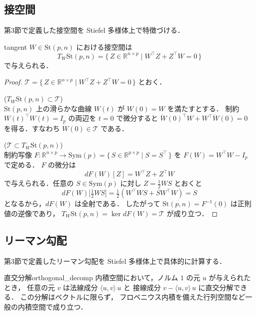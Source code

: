 \documentclass[uplatex, dvipdfmx]{jsarticle}
\begin{document}
\subsection{接空間}

第3節で定義した接空間を Stiefel 多様体上で特徴づける．

\begin{proposition}{}{tangent}
$W\in\mathrm{St}(p,n)$ における接空間は
\[
T_W\mathrm{St}(p,n)
=
\{\, Z\in\mathbb{R}^{n\times p}
\mid
W^\top Z + Z^\top W = 0
\,\}
\]
で与えられる．
\end{proposition}

\begin{proof}
$\mathcal{T}=\{\, Z\in\mathbb{R}^{n\times p}\mid W^\top Z + Z^\top W = 0\,\}$ とおく．

($T_W\mathrm{St}(p,n)\subset\mathcal{T}$)\\
$\mathrm{St}(p,n)$ 上の滑らかな曲線 $W(t)$ が $W(0)=W$ を満たすとする．
制約 $W(t)^\top W(t)=I_p$ の両辺を $t=0$ で微分すると
$\dot W(0)^\top W + W^\top\dot W(0)=0$
を得る．すなわち $\dot W(0)\in\mathcal{T}$ である．

($\mathcal{T}\subset T_W\mathrm{St}(p,n)$)\\
制約写像 $F\colon\mathbb{R}^{n\times p}\to\mathrm{Sym}(p)=\{\, S\in\mathbb{R}^{p\times p}\mid S=S^\top \,\}$ を
$F(W)=W^\top W - I_p$ で定める．
$F$ の微分は
\[
dF(W)[Z]=W^\top Z + Z^\top W
\]
で与えられる．任意の $S\in\mathrm{Sym}(p)$ に対し $Z=\tfrac{1}{2}WS$ とおくと
\[
dF(W)\bigl[\tfrac{1}{2}WS\bigr]
= \tfrac{1}{2}(W^\top W S + S W^\top W)
= S
\]
となるから，$dF(W)$ は全射である．
したがって $\mathrm{St}(p,n)=F^{-1}(0)$ は正則値の逆像であり，
$T_W\mathrm{St}(p,n)=\ker dF(W)=\mathcal{T}$ が成り立つ．
\end{proof}

\subsection{リーマン勾配}

第3節で定義したリーマン勾配を Stiefel 多様体上で具体的に計算する．

\begin{remark}{直交分解}{orthogonal_decomp}
内積空間において，ノルム $1$ の元 $u$ が与えられたとき，
任意の元 $v$ は法線成分 $\langle u,v\rangle\, u$ と
接線成分 $v - \langle u,v\rangle\, u$ に直交分解できる．
この分解はベクトルに限らず，
フロベニウス内積を備えた行列空間など一般の内積空間で成り立つ．
\end{remark}
\end{document}
